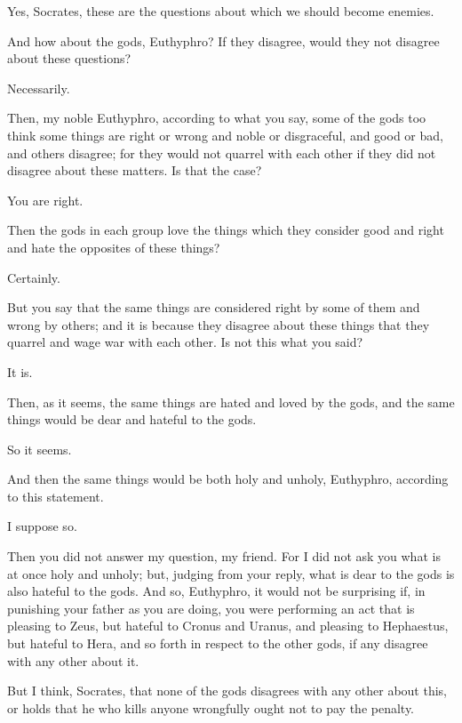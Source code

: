 \documentclass[letterpaper,12pt]{article}
\newcommand{\stephpag}[1]{\marginnote{\small\itshape\fontfamily{ppl}\selectfont #1}}
\begin{document}
\begin{drama}
\euthyphrospeaks
Yes, Socrates, these are the questions about which we should become enemies.

\socratesspeaks
And how about the gods, Euthyphro? If they disagree, would they not disagree about these questions?

\euthyphrospeaks
Necessarily. \stephpag{e}

\socratesspeaks
Then, my noble Euthyphro, according to what you say, some of the gods too think some things are right or wrong and noble or disgraceful, and good or bad, and others disagree; for they would not quarrel with each other if they did not disagree about these matters. Is that the case?

\euthyphrospeaks
You are right.

\socratesspeaks
Then the gods in each group love the things which they consider good and right and hate the opposites of these things?

\euthyphrospeaks
Certainly.

\socratesspeaks
But you say that the same things are considered right by some of them and wrong by others; and it is because they disagree about these things \stephpag{8 a} that they quarrel and wage war with each other. Is not this what you said?

\euthyphrospeaks
It is.

\socratesspeaks
Then, as it seems, the same things are hated and loved by the gods, and the same things would be dear and hateful to the gods.

\euthyphrospeaks
So it seems.

\socratesspeaks
And then the same things would be both holy and unholy, Euthyphro, according to this statement.

\euthyphrospeaks
I suppose so.

\socratesspeaks
Then you did not answer my question, my friend. For I did not ask you what is at once holy and unholy; but, judging from your reply, what is dear to the gods is also hateful to the gods. And so, Euthyphro, \stephpag{b} it would not be surprising if, in punishing your father as you are doing, you were performing an act that is pleasing to Zeus, but hateful to Cronus and Uranus, and pleasing to Hephaestus, but hateful to Hera, and so forth in respect to the other gods, if any disagree with any other about it.

\euthyphrospeaks
But I think, Socrates, that none of the gods disagrees with any other about this, or holds that he who kills anyone wrongfully ought not to pay the penalty.


\end{drama}
\end{document}
